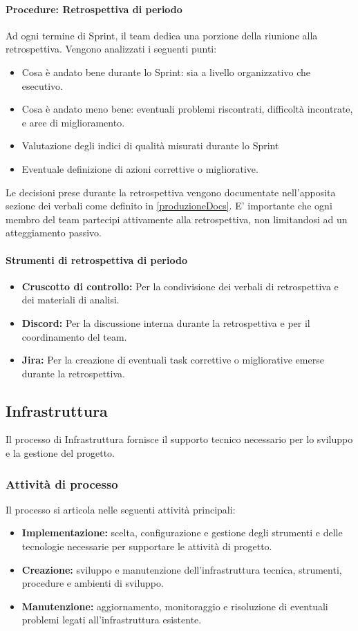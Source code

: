 \documentclass[a4paper,12pt]{article}
\begin{document}
\paragraph{Procedure: Retrospettiva di periodo}
Ad ogni termine di Sprint, il team dedica una porzione della riunione alla retrospettiva. Vengono analizzati i seguenti punti:
\begin{itemize}
    \item Cosa è andato bene durante lo Sprint: sia a livello organizzativo che esecutivo.
    \item Cosa è andato meno bene: eventuali problemi riscontrati, difficoltà incontrate, e aree di miglioramento.
    \item Valutazione degli indici di qualità misurati durante lo Sprint
    \item Eventuale definizione di azioni correttive o migliorative.
\end{itemize}
Le decisioni prese durante la retrospettiva vengono documentate nell'apposita sezione dei verbali come definito in \ref{produzioneDocs}. E' importante
che ogni membro del team partecipi attivamente alla retrospettiva, non limitandosi ad un atteggiamento passivo.

\paragraph{Strumenti di retrospettiva di periodo}
\begin{itemize}
    \item \textbf{Cruscotto di controllo:} Per la condivisione dei verbali di retrospettiva e dei materiali di analisi.
    \item \textbf{Discord:} Per la discussione interna durante la retrospettiva e per il coordinamento del team.
    \item \textbf{Jira:} Per la creazione di eventuali task correttive o migliorative emerse durante la retrospettiva.
\end{itemize}

\subsection{Infrastruttura}
Il processo di Infrastruttura fornisce il supporto tecnico necessario per lo
sviluppo e la gestione del progetto.

\subsubsection{Attività di processo}
Il processo si articola nelle seguenti attività principali:
\begin{itemize}
    \item \textbf{Implementazione:} scelta, configurazione e gestione degli strumenti e delle tecnologie necessarie per supportare le attività di progetto.
    \item \textbf{Creazione:} sviluppo e manutenzione dell'infrastruttura tecnica, strumenti, procedure e ambienti di sviluppo.
    \item \textbf{Manutenzione:} aggiornamento, monitoraggio e risoluzione di eventuali problemi legati all'infrastruttura esistente.
\end{itemize}
\end{document}
